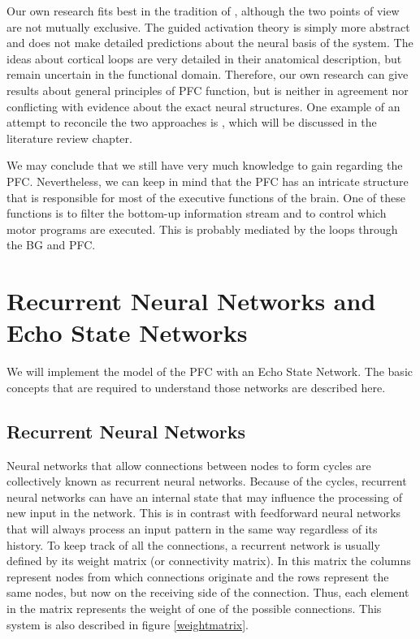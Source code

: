 \documentclass[10pt,a4paper]{report}
\begin{document}
Our own research fits best in the tradition of \citet{Miller2001}, although the two points of view are not mutually exclusive. The guided activation theory is simply more abstract and does not make detailed predictions about the neural basis of the system. The ideas about cortical loops are very detailed in their anatomical description, but remain uncertain in the functional domain. Therefore, our own research can give results about general principles of PFC function, but is neither in agreement nor conflicting with evidence about the exact neural structures. One example of an attempt to reconcile the two approaches is \citet{Reynolds2009}, which will be discussed in the literature review chapter. 

We may conclude that we still have very much knowledge to gain regarding the PFC. Nevertheless, we can keep in mind that the PFC has an intricate structure that is responsible for most of the executive functions of the brain. One of these functions is to filter the bottom-up information stream and to control which motor programs are executed. This is probably mediated by the loops through the BG and PFC.

\section{Recurrent Neural Networks and Echo State Networks}
We will implement the model of the PFC with an Echo State Network. The basic concepts that are required to understand those networks are described here.

\subsection*{Recurrent Neural Networks}
Neural networks that allow connections between nodes to form cycles are collectively known as recurrent neural networks. Because of the cycles, recurrent neural networks can have an internal state that may influence the processing of new input in the network. This is in contrast with feedforward neural networks that will always process an input pattern in the same way regardless of its history. To keep track of all the connections, a recurrent network is usually defined by its weight matrix (or connectivity matrix). In this matrix the columns represent nodes from which connections originate and the rows represent the same nodes, but now on the receiving side of the connection. Thus, each element in the matrix represents the weight of one of the possible connections. This system is also described in figure \ref{weightmatrix}.
\end{document}
